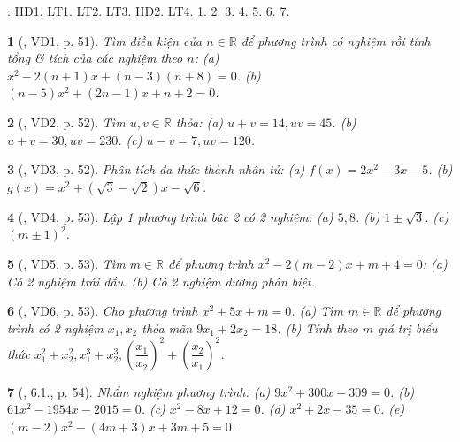 \documentclass{article}
\newtheorem{baitoan}{}
\begin{document}
\noindent\cite[Chap. VII, \S3, pp. 61--65]{SGK_Toan_9_Canh_Dieu_tap_2}: HD1. LT1. LT2. LT3. HD2. LT4. 1. 2. 3. 4. 5. 6. 7.

\begin{baitoan}[\cite{Binh_boi_duong_Toan_9_tap_2}, VD1, p. 51]
	Tìm điều kiện của $n\in\mathbb{R}$ để phương trình có nghiệm rồi tính tổng \& tích của các nghiệm theo $n$: (a) $x^2 - 2(n + 1)x + (n - 3)(n + 8) = 0$. (b) $(n - 5)x^2 + (2n - 1)x + n + 2 = 0$.
\end{baitoan}

\begin{baitoan}[\cite{Binh_boi_duong_Toan_9_tap_2}, VD2, p. 52]
	Tìm $u,v\in\mathbb{R}$ thỏa: (a) $u + v = 14,uv = 45$. (b) $u + v = 30,uv = 230$. (c) $u - v = 7,uv = 120$.
\end{baitoan}

\begin{baitoan}[\cite{Binh_boi_duong_Toan_9_tap_2}, VD3, p. 52]
	Phân tích đa thức thành nhân tử: (a) $f(x) = 2x^2 - 3x - 5$. (b) $g(x) = x^2 + (\sqrt{3} - \sqrt{2})x - \sqrt{6}$.
\end{baitoan}

\begin{baitoan}[\cite{Binh_boi_duong_Toan_9_tap_2}, VD4, p. 53]
	Lập 1 phương trình bậc 2 có 2 nghiệm: (a) $5,8$. (b) $1\pm\sqrt{3}$. (c) $(m\pm1)^2$.
\end{baitoan}

\begin{baitoan}[\cite{Binh_boi_duong_Toan_9_tap_2}, VD5, p. 53]
	Tìm $m\in\mathbb{R}$ để phương trình $x^2 - 2(m - 2)x + m + 4 = 0$: (a) Có 2 nghiệm trái dấu. (b) Có 2 nghiệm dương phân biệt.
\end{baitoan}

\begin{baitoan}[\cite{Binh_boi_duong_Toan_9_tap_2}, VD6, p. 53]
	Cho phương trình $x^2 + 5x + m = 0$. (a) Tìm $m\in\mathbb{R}$ để phương trình có 2 nghiệm $x_1,x_2$ thỏa mãn $9x_1 + 2x_2 = 18$. (b) Tính theo $m$ giá trị biểu thức $x_1^2 + x_2^2,x_1^3 + x_2^3,\left(\dfrac{x_1}{x_2}\right)^2 + \left(\dfrac{x_2}{x_1}\right)^2$.
\end{baitoan}

\begin{baitoan}[\cite{Binh_boi_duong_Toan_9_tap_2}, 6.1., p. 54]
	Nhẩm nghiệm phương trình: (a) $9x^2 + 300x - 309 = 0$. (b) $61x^2 - 1954x - 2015 = 0$. (c) $x^2 - 8x + 12 = 0$. (d) $x^2 + 2x - 35 = 0$. (e) $(m - 2)x^2 - (4m + 3)x + 3m + 5 = 0$.
\end{baitoan}
\end{document}

